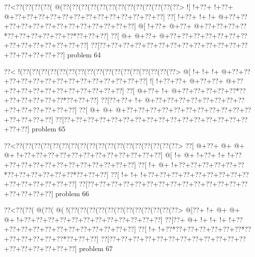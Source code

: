\vbox{\vbox{\goo
\0??<\0??(\0??(\0??(\0??(\- @(\0??(\0??(\0??(\0??(\0??(\0??(\0??(\0??(\0??(\0??(\0??(\0??(\0??>
\- ![\- !+\0??+\- !+\0??+\- @+\0??+\0??+\0??+\0??+\0??+\0??+\0??+\0??+\0??+\0??+\0??+\0??+\0??]
\0??[\- !+\0??+\- !+\- !+\- @+\0??+\0??+\0??+\0??+\0??+\0??+\0??+\0??+\0??+\0??+\0??+\0??+\0??]
\- @[\- !+\0??+\- @+\0??+\- @+\0??+\0??+\0??+\0??*\0??+\0??+\0??+\0??+\0??+\0??*\0??+\0??+\0??]
\0??[\- @+\- @+\0??+\- @+\0??+\0??+\0??+\0??+\0??+\0??+\0??+\0??+\0??+\0??+\0??+\0??+\0??+\0??]
\0??[\0??+\0??+\0??+\0??+\0??+\0??+\0??+\0??+\0??+\0??+\0??+\0??+\0??+\0??+\0??+\0??+\0??+\0??]
}
\hfil problem 64\hfil\break
}



\vbox{\vbox{\goo
\0??<\- !(\0??(\0??(\0??(\0??(\0??(\0??(\0??(\0??(\0??(\0??(\0??(\0??(\0??(\0??(\0??(\0??(\0??>
\- @[\- !+\- !+\- !+\- @+\0??+\0??+\0??+\0??+\0??+\0??+\0??+\0??+\0??+\0??+\0??+\0??+\0??+\0??]
\- ![\- !+\0??+\0??+\- @+\0??+\0??+\- @+\0??+\0??+\0??+\0??+\0??+\0??+\0??+\0??+\0??+\0??+\0??]
\0??[\- @+\0??+\- !+\- @+\0??+\0??+\0??+\0??+\0??*\0??+\0??+\0??+\0??+\0??+\0??*\0??+\0??+\0??]
\0??[\0??+\0??+\- !+\- @+\0??+\0??+\0??+\0??+\0??+\0??+\0??+\0??+\0??+\0??+\0??+\0??+\0??+\0??]
\0??[\- @+\- @+\- @+\0??+\0??+\0??+\0??+\0??+\0??+\0??+\0??+\0??+\0??+\0??+\0??+\0??+\0??+\0??]
\0??[\0??+\0??+\0??+\0??+\0??+\0??+\0??+\0??+\0??+\0??+\0??+\0??+\0??+\0??+\0??+\0??+\0??+\0??]
}
\hfil problem 65\hfil\break
}



\vbox{\vbox{\goo
\0??<\0??(\0??(\0??(\0??(\0??(\0??(\0??(\0??(\0??(\0??(\0??(\0??(\0??(\0??(\0??(\0??(\0??(\0??>
\0??[\- @+\0??+\- @+\- @+\- @+\- !+\0??+\0??+\0??+\0??+\0??+\0??+\0??+\0??+\0??+\0??+\0??+\0??]
\- @[\- !+\- @+\- !+\0??+\- !+\- !+\0??+\0??+\0??+\0??+\0??+\0??+\0??+\0??+\0??+\0??+\0??+\0??]
\0??[\- !+\- @+\- !+\0??+\0??+\0??+\0??+\0??+\0??*\0??+\0??+\0??+\0??+\0??+\0??*\0??+\0??+\0??]
\0??[\- !+\- !+\- !+\0??+\0??+\0??+\0??+\0??+\0??+\0??+\0??+\0??+\0??+\0??+\0??+\0??+\0??+\0??]
\0??[\0??+\0??+\0??+\0??+\0??+\0??+\0??+\0??+\0??+\0??+\0??+\0??+\0??+\0??+\0??+\0??+\0??+\0??]
}
\hfil problem 66\hfil\break
}



\vbox{\vbox{\goo
\0??<\0??(\0??(\- @(\0??(\- @(\- !(\0??(\0??(\0??(\0??(\0??(\0??(\0??(\0??(\0??(\0??(\0??(\0??>
\- @[\0??+\- !+\- @+\- @+\- @+\- !+\0??+\0??+\0??+\0??+\0??+\0??+\0??+\0??+\0??+\0??+\0??+\0??]
\0??[\0??+\- @+\- !+\- !+\- !+\- !+\0??+\0??+\0??+\0??+\0??+\0??+\0??+\0??+\0??+\0??+\0??+\0??]
\0??[\- !+\- !+\0??*\0??+\0??+\0??+\0??+\0??+\0??*\0??+\0??+\0??+\0??+\0??+\0??*\0??+\0??+\0??]
\0??[\0??+\0??+\0??+\0??+\0??+\0??+\0??+\0??+\0??+\0??+\0??+\0??+\0??+\0??+\0??+\0??+\0??+\0??]
}
\hfil problem 67\hfil\break
}



